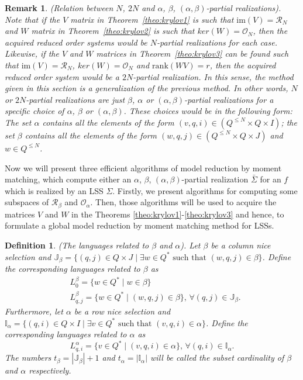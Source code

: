 \documentclass[journal]{IEEEtran}
\newcommand{\IM}{\mathrm{im}}
\newcommand{\Rank}{\mathrm{rank}}
\newtheorem{Definition}{Definition}
\newtheorem{Remark}{Remark}
\begin{document}
\begin{Remark}
	\emph{(Relation between $N$, $2N$ and $\alpha$, $\beta$, $(\alpha,\beta)$-partial realizations).}
	Note that if the $V$ matrix in Theorem~\ref{theo:krylov1} is such that $\IM(V)= \mathscr{R}_N$ and $W$ matrix in Theorem~\ref{theo:krylov2} is such that $ker(W)=\mathscr{O}_N$, then the acquired reduced order systems would be $N$-partial realizations for each case. Likewise, if the $V$ and $W$ matrices in Theorem~\ref{theo:krylov3} can be found such that $\IM(V)= \mathscr{R}_N$, $ker(W)=\mathscr{O}_N$ and $\Rank(WV)=r$, then the acquired reduced order system would be a $2N$-partial realization. In this sense, the method given in this section is a generalization of the previous method. In other words, $N$ or $2N$-partial realizations are just $\beta$, $\alpha$ or $(\alpha,\beta)$-partial realizations for a specific choice of $\alpha$, $\beta$ or $(\alpha,\beta)$. These choices would be in the following form: The set $\alpha$ contains all the elements of the form $(v,q,i) \in (Q^{\leq N} \times Q \times I)$; the set $\beta$ contains all the elements of the form $(w,q,j) \in (Q^{\leq N} \times Q \times J)$ and $w \in Q^{\leq N}$.
\end{Remark}


Now we will present three efficient algorithms of model reduction by moment matching, which compute either an $\alpha$, $\beta$, $(\alpha,\beta)$-partial realization $\bar{\Sigma}$ for an $f$ which is realized by an LSS $\Sigma$. Firstly, we present algorithms for computing some subspaces of $\mathscr{R}_{\beta}$ and $\mathscr{O}_{\alpha}$. Then, those algorithms will be used to acquire the matrices $V$ and $W$ in the Theorems \ref{theo:krylov1}-\ref{theo:krylov3} and hence, to formulate a global model reduction by moment matching method for LSSs.

\begin{Definition} \label{def:subsets}
	\emph{(The languages related to $\beta$ and $\alpha$).}
	Let $\beta$ be a column nice selection and  $\mathbb{J}_\beta= \{ (q,j) \in Q \times J \mid \exists w \in Q^* \mbox{ such that } (w,q,j) \in \beta \}$. Define the corresponding languages related to $\beta$ as
	\begin{align} \label{eq:reach_language}
		& L^\beta_0= \{ w \in Q^* \mid w \in \beta \} \\
		& L^\beta_{q,j} = \{ w \in Q^* \mid (w,q,j) \in \beta \} \mbox{, } \forall (q,j) \in \mathbb{J}_\beta.
	\end{align}
	Furthermore, let $\alpha$ be a row nice selection and $\mathbb{I}_\alpha= \{ (q,i) \in Q \times I \mid \exists v \in Q^* \mbox{ such that } (v,q,i) \in \alpha \}$. Define the corresponding languages related to $\alpha$ as
	\begin{equation} \label{eq:obs_language}
		L^\alpha_{q,i}= \{ v \in Q^* \mid (v,q,i) \in \alpha \} \mbox{, } \forall (q,i) \in \mathbb{I}_\alpha.
	\end{equation}
	The numbers $t_\beta=|\mathbb{J}_\beta|+1$ and $t_\alpha=|\mathbb{I}_\alpha|$ will be called the \emph{subset cardinality} of $\beta$ and $\alpha$ respectively.
\end{Definition}
\end{document}
